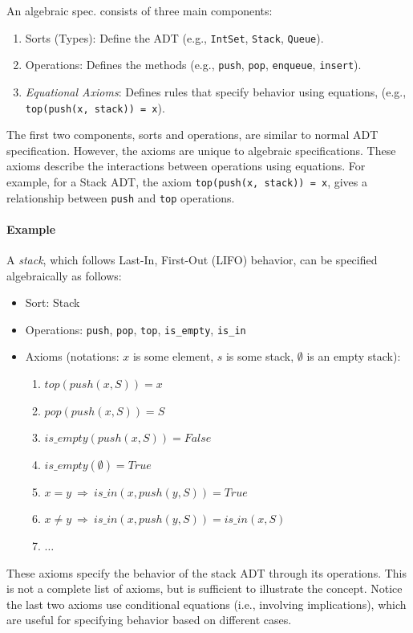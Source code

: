 \documentclass[oneside,11pt,dvipsnames]{book}
\renewcommand{\implies}{\Rightarrow}
\newcommand{\code}[1]{\texttt{#1}}
\begin{document}
An algebraic spec. consists of three main components: 
\begin{enumerate}
\item Sorts (Types): Define the ADT (e.g., \code{IntSet}, \code{Stack}, \code{Queue}).
\item Operations: Defines the methods (e.g., \code{push}, \code{pop}, \code{enqueue}, \code{insert}).
\item \emph{Equational Axioms}: Defines rules that specify behavior using equations, (e.g., \code{top(push(x, stack)) = x}).
\end{enumerate}

The first two components, sorts and operations, are similar to normal ADT specification. However, the axioms are unique to algebraic specifications. These axioms describe the interactions between operations using equations. For example, for a Stack ADT, the axiom \code{top(push(x, stack)) = x}, gives a relationship between \code{push} and \code{top} operations.



\paragraph{Example}  A \emph{stack}, which follows Last-In, First-Out (LIFO) behavior, can be specified algebraically as follows:
\begin{itemize}
    \item Sort: Stack
    \item Operations: \code{push}, \code{pop}, \code{top}, \code{is\_empty}, \code{is\_in}
    \item Axioms (notations: $x$ is some element, $s$ is some stack, $\emptyset$ is an empty stack):
    \begin{enumerate}
        \item $top(push(x, S)) = x$
        \item $pop(push(x, S)) = S$
        \item $is\_empty(push(x, S)) = False$
        \item $is\_empty(\emptyset) = True$
        \item $x = y ~\implies~ is\_in(x, push(y, S))  = True$
        \item $x \neq y ~\implies~ is\_in(x, push(y, S)) = is\_in(x, S)$ 
        \item $\ldots$
    \end{enumerate}
\end{itemize}

These axioms specify the behavior of the stack ADT through its operations. This is not a complete list of axioms, but is sufficient to illustrate the concept.
Notice the last two axioms use conditional equations (i.e., involving implications), which are useful for specifying behavior based on different cases.  
\end{document}
